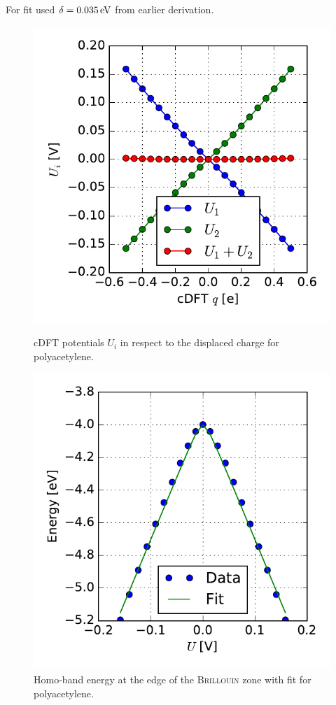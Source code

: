 \newpage
For fit used $\delta = \unit[0.035]{eV}$ from earlier derivation.
\begin{figure}
	\centering
	\begin{minipage}{0.45\textwidth}
	\includegraphics[width = \textwidth]{Images/polyacetylene/charging/potential_q_1}
	\caption{cDFT potentials $U_i$ in respect to the displaced charge for polyacetylene.}
	\label{}
	\end{minipage}
	\begin{minipage}{.45\textwidth}
	\includegraphics[width = \textwidth]{Images/polyacetylene/charging/border_energy_q_1}
	\caption{Homo-band energy at the edge of the \textsc{Brillouin} zone with fit for polyacetylene.}
	\label{}
	\end{minipage}
\end{figure}
